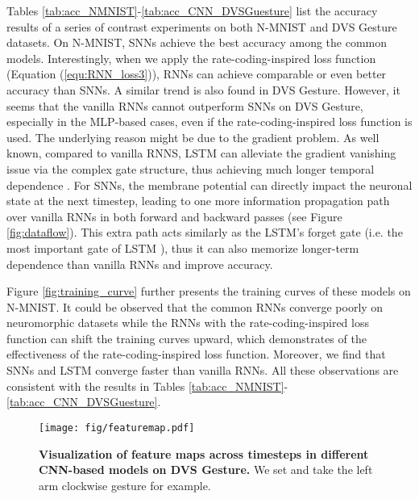 \documentclass[journal,10pt,twocolumn]{IEEETran}
\begin{document}
Tables \ref{tab:acc_NMNIST}-\ref{tab:acc_CNN_DVSGuesture} list the accuracy results of a series of contrast experiments on both N-MNIST and DVS Gesture datasets. On N-MNIST, SNNs achieve the best accuracy among the common models. Interestingly, when we apply the rate-coding-inspired loss function (Equation (\ref{equ:RNN_loss3})), RNNs can achieve comparable or even better accuracy than SNNs. A similar trend is also found in DVS Gesture. However, it seems that the vanilla RNNs cannot outperform SNNs on DVS Gesture, especially in the MLP-based cases, even if the rate-coding-inspired loss function is used. The underlying reason might be due to the gradient problem. As well known, compared to vanilla RNNS, LSTM can alleviate the gradient vanishing issue via the complex gate structure, thus achieving much longer temporal dependence \cite{hochreiter1997long,gers1999learning}. For SNNs, the membrane potential can directly impact the neuronal state at the next timestep, leading to one more information propagation path over vanilla RNNs in both forward and backward passes (see Figure \ref{fig:dataflow}). This extra path acts similarly as the LSTM's forget gate (i.e. the most important gate of LSTM \cite{jozefowicz2015empirical}), thus it can also memorize longer-term dependence than vanilla RNNs and improve accuracy.

Figure \ref{fig:training_curve} further presents the training curves of these models on N-MNIST. It could be observed that the common RNNs converge poorly on neuromorphic datasets while the RNNs with the rate-coding-inspired loss function can shift the training curves upward, which demonstrates of the effectiveness of the rate-coding-inspired loss function. Moreover, we find that SNNs and LSTM converge faster than vanilla RNNs. All these observations are consistent with the results in Tables \ref{tab:acc_NMNIST}-\ref{tab:acc_CNN_DVSGuesture}. 

\begin{figure}[!htbp]
\centering     
\texttt{[image: fig/featuremap.pdf]}
\caption{\textbf{Visualization of feature maps across timesteps in different CNN-based models on DVS Gesture.} We set  and take the left arm clockwise gesture for example.} \label{fig:FM} 
\end{figure}
\end{document}
